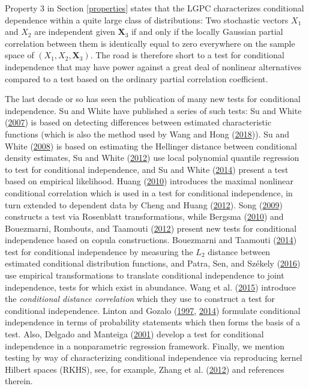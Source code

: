 \documentclass[
  12pt,
  letterpaper]{article}
\newcommand{\X}{\bm{X}}
\theoremstyle{definition}
\theoremstyle{definition}
\theoremstyle{definition}
\theoremstyle{remark}
\begin{document}
Property 3 in Section \ref{properties} states that the LGPC characterizes conditional dependence within a quite large class of distributions: Two stochastic vectors \(X_1\) and \(X_2\) are independent given \(\X_3\) if and only if the locally Gaussian partial correlation between them is identically equal to zero everywhere on the sample space of \((X_1, X_2, \X_3)\). The road is therefore short to a test for conditional independence that may have power against a great deal of nonlinear alternatives compared to a test based on the ordinary partial correlation coefficient.

The last decade or so has seen the publication of many new tests for conditional independence. Su and White have published a series of such tests: Su and White (\protect\hyperlink{ref-su2007consistent}{2007}) is based on detecting differences between estimated characteristic functions (which is also the method used by Wang and Hong (\protect\hyperlink{ref-wang2017characteristic}{2018})). Su and White (\protect\hyperlink{ref-su2008nonparametric}{2008}) is based on estimating the Hellinger distance between conditional density estimates, Su and White (\protect\hyperlink{ref-su2012conditional}{2012}) use local polynomial quantile regression to test for conditional independence, and Su and White (\protect\hyperlink{ref-su2014testing}{2014}) present a test based on empirical likelihood. Huang (\protect\hyperlink{ref-huang2010testing}{2010}) introduces the maximal nonlinear conditional correlation which is used in a test for conditional independence, in turn extended to dependent data by Cheng and Huang (\protect\hyperlink{ref-cheng2012conditional}{2012}). Song (\protect\hyperlink{ref-song2009testing}{2009}) constructs a test via Rosenblatt transformations, while Bergsma (\protect\hyperlink{ref-bergsma2011nonparametric}{2010}) and Bouezmarni, Rombouts, and Taamouti (\protect\hyperlink{ref-bouezmarni2012nonparametric}{2012}) present new tests for conditional independence based on copula constructions. Bouezmarni and Taamouti (\protect\hyperlink{ref-boue:taam:2014}{2014}) test for conditional independence by measuring the \(L_2\) distance between estimated conditional distribution functions, and Patra, Sen, and Székely (\protect\hyperlink{ref-patra2016on}{2016}) use empirical transformations to translate conditional independence to joint independence, tests for which exist in abundance. Wang et al. (\protect\hyperlink{ref-wang2015conditional}{2015}) introduce the \emph{conditional distance correlation} which they use to construct a test for conditional independence. Linton and Gozalo (\protect\hyperlink{ref-linton1997conditional}{1997}, \protect\hyperlink{ref-linton2014testing}{2014}) formulate conditional independence in terms of probability statements which then forms the basis of a test. Also, Delgado and Manteiga (\protect\hyperlink{ref-delgado2001significance}{2001}) develop a test for conditional independence in a nonparametric regression framework. Finally, we mention testing by way of characterizing conditional independence via reproducing kernel Hilbert spaces (RKHS), see, for example, Zhang et al. (\protect\hyperlink{ref-zhang2012kernel}{2012}) and references therein.
\end{document}
